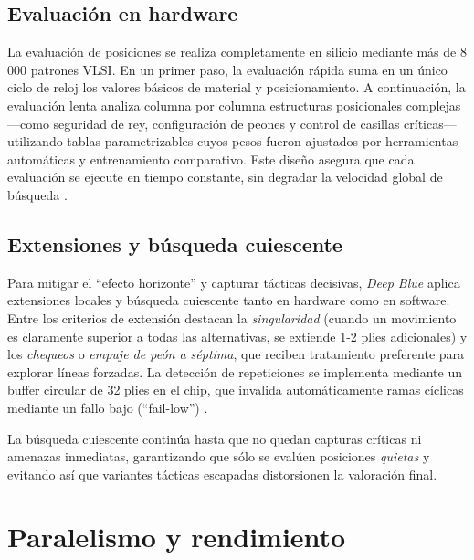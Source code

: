 \documentclass[a4paper, 12pt]{article}
\begin{document}
\subsection{Evaluación en hardware}

La evaluación de posiciones se realiza completamente en 
silicio mediante más de 8 000 patrones VLSI. En un primer paso, 
la evaluación rápida suma en un único ciclo de reloj los valores 
básicos de material y posicionamiento. A continuación, la 
evaluación lenta analiza columna por columna estructuras 
posicionales complejas —como seguridad de rey, configuración de 
peones y control de casillas críticas— utilizando tablas 
parametrizables cuyos pesos fueron ajustados por herramientas 
automáticas y entrenamiento comparativo. Este diseño asegura que cada 
evaluación se ejecute en tiempo constante, sin degradar la 
velocidad global de búsqueda \cite{campbell1999search}.

\subsection{Extensiones y búsqueda cuiescente}

Para mitigar el “efecto horizonte” y capturar tácticas 
decisivas, \textit{Deep Blue} aplica extensiones locales y 
búsqueda cuiescente tanto en hardware como en software. 
Entre los criterios de extensión destacan la \emph{singularidad} 
(cuando un movimiento es claramente superior a todas las alternativas, 
se extiende 1-2 plies adicionales) y los \emph{chequeos} o 
\emph{empuje de peón a séptima}, que reciben tratamiento 
preferente para explorar líneas forzadas. 
La detección de repeticiones se implementa mediante un buffer 
circular de 32 plies en el chip, que invalida automáticamente 
ramas cíclicas mediante un fallo bajo (“fail-low”) \cite{campbell1999search}.  

La búsqueda cuiescente continúa hasta que no quedan capturas 
críticas ni amenazas inmediatas, garantizando que sólo se 
evalúen posiciones \emph{quietas} y evitando así que variantes 
tácticas escapadas distorsionen la valoración final.














\section{Paralelismo y rendimiento}
\end{document}
